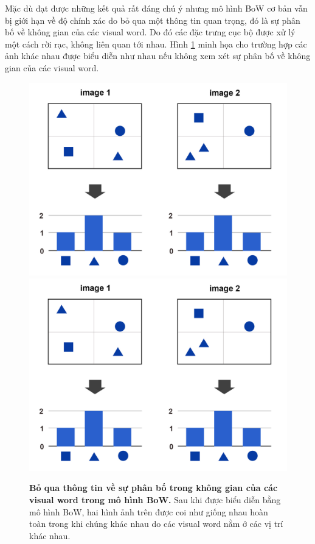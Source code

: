 Mặc dù đạt được những kết quả rất đáng chú ý nhưng mô hình BoW cơ bản vẫn bị giới hạn về độ chính xác do bỏ qua một thông tin quan trọng, đó là sự phân bố về không gian của các visual word. Do đó các đặc trưng cục bộ được xử lý một cách rời rạc, không liên quan tới nhau. Hình \ref{FigLimited} minh họa cho trường hợp các ảnh khác nhau được biểu diễn như nhau nếu không xem xét sự phân bố về không gian của các visual word.
\begin{figure}[!htbp]
  \begin{center}
    \leavevmode
    \ifpdf
      \includegraphics[scale=0.2]{limited}
    \else
      \includegraphics[scale=0.2]{limited}
    \fi
    \caption[Bỏ qua thông tin về sự phân bố trong không gian của các visual word trong mô hình BoW]{\textbf{Bỏ qua thông tin về sự phân bố trong không gian của các visual word trong mô hình BoW.} Sau khi được biểu diễn bằng mô hình BoW, hai hình ảnh trên được coi như giống nhau hoàn toàn trong khi chúng khác nhau do các visual word nằm ở các vị trí khác nhau.}
    \label{FigLimited}
  \end{center}
\end{figure}

